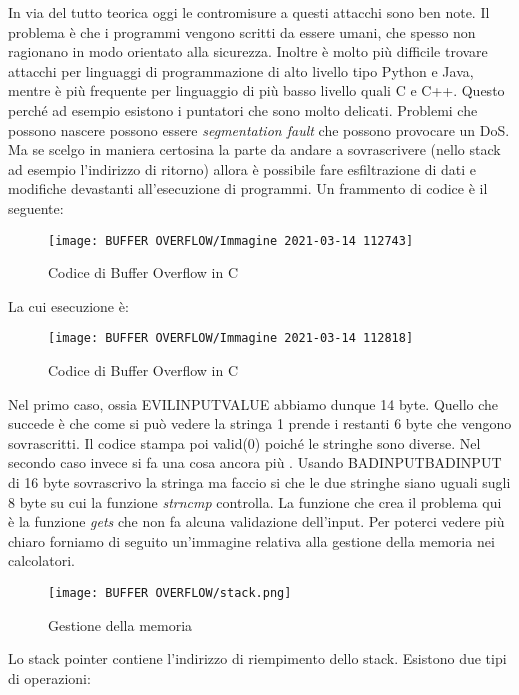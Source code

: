 \documentclass[14pt]{extreport}
\begin{document}
In via del tutto teorica oggi le contromisure a questi attacchi sono ben note. Il problema è che i programmi vengono scritti da essere umani, che spesso non ragionano in modo orientato alla sicurezza.
Inoltre è molto più difficile trovare attacchi per linguaggi di programmazione di alto livello tipo Python e Java, mentre è più frequente per linguaggio di più basso livello quali C e C++. Questo perché ad esempio esistono i puntatori che sono molto delicati.
Problemi che possono nascere possono essere \textit{segmentation fault} che possono provocare un DoS. Ma se scelgo in maniera certosina la parte da andare a sovrascrivere (nello stack ad esempio l'indirizzo di ritorno) allora è possibile fare esfiltrazione di dati e modifiche devastanti all'esecuzione di programmi.
Un frammento di codice è il seguente:

\begin{figure}[H]
    \centering
    \texttt{[image: BUFFER OVERFLOW/Immagine 2021-03-14 112743]}
    \caption{Codice di Buffer Overflow in C}
\end{figure}

La cui esecuzione è:

\begin{figure}[H]
    \centering
    \texttt{[image: BUFFER OVERFLOW/Immagine 2021-03-14 112818]}
    \caption{Codice di Buffer Overflow in C}
\end{figure}

Nel primo caso, ossia EVILINPUTVALUE abbiamo dunque 14 byte. Quello che succede è che come si può vedere la stringa 1 prende i restanti 6 byte che vengono sovrascritti. Il codice stampa poi valid(0) poiché le stringhe sono diverse.
Nel secondo caso invece si fa una cosa ancora più . Usando BADINPUTBADINPUT di 16 byte sovrascrivo la stringa ma faccio si che le due stringhe siano uguali sugli 8 byte su cui la funzione \textit{strncmp} controlla. La funzione che crea il problema qui è la funzione \textit{gets} che non fa alcuna validazione dell'input.
Per poterci vedere più chiaro forniamo di seguito un'immagine relativa alla gestione della memoria nei calcolatori.


\begin{figure}[H]
    \centering
    \texttt{[image: BUFFER OVERFLOW/stack.png]}
    \caption{Gestione della memoria}
\end{figure}
Lo stack pointer contiene l'indirizzo di riempimento dello stack. Esistono due tipi di operazioni:
\end{document}

